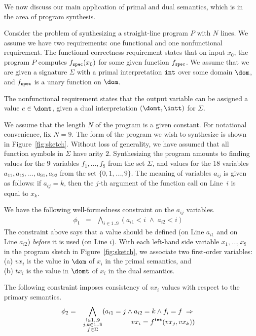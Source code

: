 \documentclass[preprint]{sig-alternate-05-2015}
\def\int{{\tt{int}}}
\def\spec{{\tt{spec}}}
\def\Sig{{\Sigma}}
\begin{document}
{We now discuss our main application of primal and dual
semantics, which is in the area of program synthesis.

Consider the problem of synthesizing a straight-line program $P$
with $N$ lines.
We assume we have two requirements:
one functional and one nonfunctional requirement.
The functional correctness requirement states that
on input $x_0$, the program $P$ computes $f_\spec(x_0)$
for some given function $f_\spec$.
We assume that we are given a signature $\Sig$ with a
primal interpretation $\int$ over some domain $\dom$,
and $f_\spec$ is a unary function on $\dom$.

The nonfunctional requirement states that
the output variable can be assigned a value $e\in\domt$,
given a dual interpretation $(\domt,\intt)$ for $\Sig$.


We assume that the length $N$ of the program is a given
constant. For notational convenience, fix $N=9$.
The form of the program we wish to synthesize is shown in
Figure~\ref{fig:sketch}.
Without loss of generality, we have assumed that all
function symbols in $\Sig$ have arity $2$.
Synthesizing the program amounts to
finding values for the $9$ variables $f_1,\ldots,f_9$ from
the set $\Sig$, and values for the
$18$ variables $a_{11},a_{12},\ldots,a_{91},a_{92}$ from
the set $\{0,1,\ldots,9\}$. The meaning of variables
$a_{ij}$ is given as follows: if $a_{ij} = k$, then the $j$-th
argument of the function call on Line~$i$ is equal to $x_k$.

We have the following well-formedness constraint on the $a_{ij}$
variables.
\begin{eqnarray*}
  \phi_1 & = & \bigwedge_{i\in 1..9} (a_{i1} < i \;\wedge\; a_{i2}<i)
\end{eqnarray*}
The constraint above says that a value should be defined (on Line $a_{i1}$ and
on Line $a_{i2}$)
{\em{before}} it is used (on Line $i$).
With each left-hand side variable $x_1,\ldots,x_9$ in the program sketch in Figure~\ref{fig:sketch},
we associate two first-order variables:
\\
(a) $vx_i$ is the value in $\dom$ of $x_i$ in the primal semantics, and
\\
(b) $tx_i$ is the value in $\domt$ of $x_i$ in the dual semantics.

The following constraint imposes consistency of $vx_i$ values with respect to the primary semantics.
\begin{eqnarray*}
  \phi_2 & = & \bigwedge_{\substack{i\in 1..9\\j,k\in 1..9\\ f\in\Sig}}
    (a_{i1} = j \wedge a_{i2}=k \wedge f_i=f\;\Rightarrow\;
    \\*[-2.5em] & & \qquad\qquad\qquad vx_i=f^\int(vx_j,vx_k))
\end{eqnarray*}

}
\end{document}
